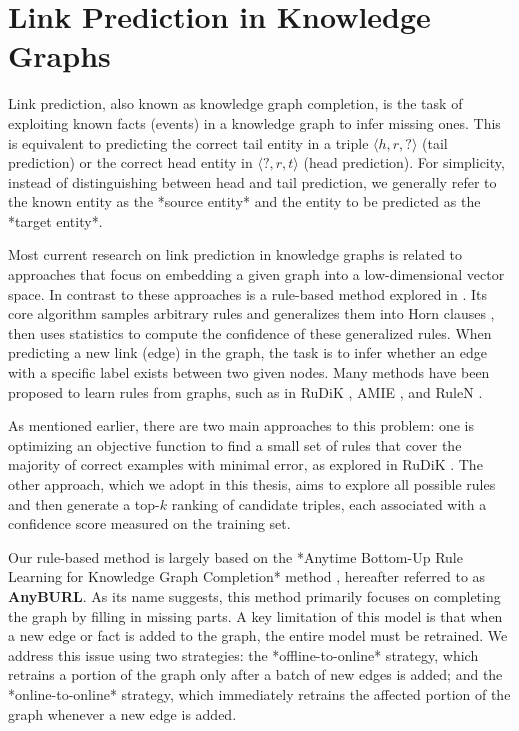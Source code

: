 \section{Link Prediction in Knowledge Graphs}

Link prediction, also known as knowledge graph completion, is the task of exploiting known facts (events) in a knowledge graph to infer missing ones. This is equivalent to predicting the correct tail entity in a triple $\langle h, r, ? \rangle$ (tail prediction) or the correct head entity in $\langle ?, r, t \rangle$ (head prediction). For simplicity, instead of distinguishing between head and tail prediction, we generally refer to the known entity as the *source entity* and the entity to be predicted as the *target entity*.

Most current research on link prediction in knowledge graphs is related to approaches that focus on embedding a given graph into a low-dimensional vector space. In contrast to these approaches is a rule-based method explored in \cite{burl}. Its core algorithm samples arbitrary rules and generalizes them into Horn clauses \cite{wiki:Horn}, then uses statistics to compute the confidence of these generalized rules. When predicting a new link (edge) in the graph, the task is to infer whether an edge with a specific label exists between two given nodes. Many methods have been proposed to learn rules from graphs, such as in RuDiK \cite{ortona2018robust}, AMIE \cite{galarraga2015fast}, and RuleN \cite{meilicke2018fine}.

As mentioned earlier, there are two main approaches to this problem: one is optimizing an objective function to find a small set of rules that cover the majority of correct examples with minimal error, as explored in RuDiK \cite{ortona2018robust}. The other approach, which we adopt in this thesis, aims to explore all possible rules and then generate a top-\(k\) ranking of candidate triples, each associated with a confidence score measured on the training set.

Our rule-based method is largely based on the *Anytime Bottom-Up Rule Learning for Knowledge Graph Completion* method \cite{meilicke2019anytime}, hereafter referred to as \textbf{AnyBURL}. As its name suggests, this method primarily focuses on completing the graph by filling in missing parts. A key limitation of this model is that when a new edge or fact is added to the graph, the entire model must be retrained. We address this issue using two strategies: the *offline-to-online* strategy, which retrains a portion of the graph only after a batch of new edges is added; and the *online-to-online* strategy, which immediately retrains the affected portion of the graph whenever a new edge is added.


